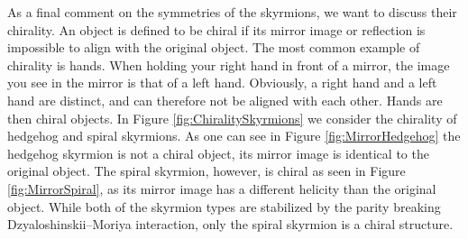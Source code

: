As a final comment on the symmetries of the skyrmions, we want to discuss their chirality. An object is defined to be chiral if its mirror image or reflection is impossible to align with the original object. The most common example of chirality is hands. When holding your right hand in front of a mirror, the image you see in the mirror is that of a left hand. Obviously, a right hand and a left hand are distinct, and can therefore not be aligned with each other. Hands are then chiral objects. In Figure \ref{fig:ChiralitySkyrmions} we consider the chirality of hedgehog and spiral skyrmions. As one can see in Figure \ref{fig:MirrorHedgehog} the hedgehog skyrmion is not a chiral object, its mirror image is identical to the original object. The spiral skyrmion, however, is chiral as seen in Figure \ref{fig:MirrorSpiral}, as its mirror image has a different helicity than the original object. While both of the skyrmion types are stabilized by the parity breaking Dzyaloshinskii--Moriya interaction, only the spiral skyrmion is a chiral structure.

